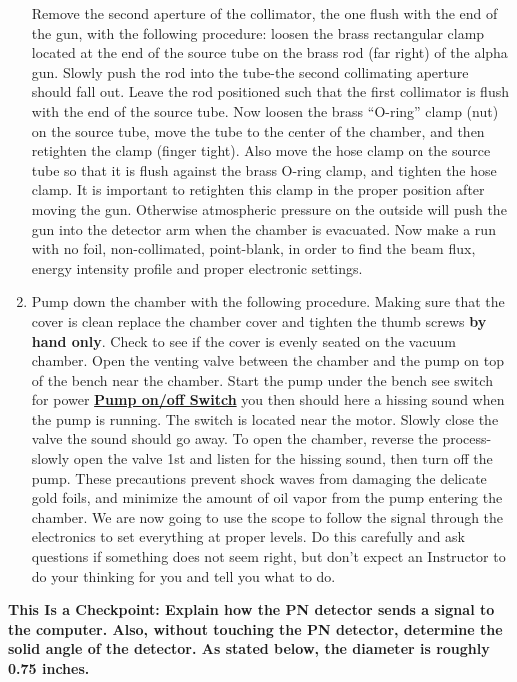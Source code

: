 \documentclass{../lab}
\begin{document}
\begin{enumerate}
    Remove the second aperture of the collimator, the one flush with the end of the gun, with the following procedure: loosen the brass rectangular clamp located at the end of the source tube on the brass rod (far right) of the alpha gun. Slowly push the rod into the tube-the second collimating aperture should fall out. Leave the rod positioned such that the first collimator is flush with the end of the source tube. Now loosen the brass ``O-ring'' clamp (nut) on the source tube, move the tube to the center of the chamber, and then retighten the clamp (finger tight). Also move the hose clamp on the source tube so that it is flush against the brass O-ring clamp, and tighten the hose clamp. It is important to retighten this clamp in the proper position after moving the gun. Otherwise atmospheric pressure on the outside will push the gun into the detector arm when the chamber is evacuated. Now make a run with no foil, non-collimated, point-blank, in order to find the beam flux, energy intensity profile and proper electronic settings.

    \item Pump down the chamber with the following procedure. Making sure that the cover is clean replace the chamber cover and tighten the thumb screws \textbf{by hand only}. Check to see if the cover is evenly seated on the vacuum chamber. Open the venting valve between the chamber and the pump on top of the bench near the chamber. Start the pump under the bench see switch for power \href{http://experimentationlab.berkeley.edu/sites/default/files/images/Pump\_Switch\_3535.jpg}{\textbf{Pump on/off Switch}} you then should here a hissing sound when the pump is running. The switch is located near the motor. Slowly close the valve the sound should go away. To open the chamber, reverse the process-slowly open the valve 1st and listen for the hissing sound, then turn off the pump. These precautions prevent shock waves from damaging the delicate gold foils, and minimize the amount of oil vapor from the pump entering the chamber. We are now going to use the scope to follow the signal through the electronics to set everything at proper levels. Do this carefully and ask questions if something does not seem right, but don't expect an Instructor to do your thinking for you and tell you what to do.

\end{enumerate}

\textbf{This Is a Checkpoint: Explain how the PN detector sends a signal to the computer. Also, without touching the PN detector, determine the solid angle of the detector. As stated below, the diameter is roughly 0.75 inches.}
\end{document}

